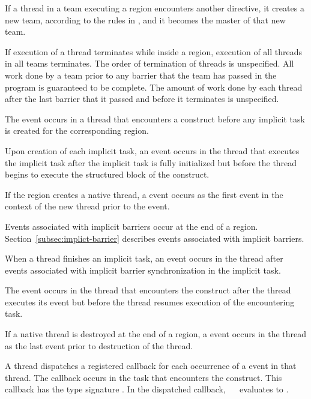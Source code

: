If a thread in a team executing a  region encounters another 
directive, it creates a new team, according to the rules in
,
and it becomes the master of that new team.

If execution of a thread terminates while inside a  region, execution of all
threads in all teams terminates. The order of termination of threads is unspecified. All
work done by a team prior to any barrier that the team has passed in the program is
guaranteed to be complete. The amount of work done by each thread after the last
barrier that it passed and before it terminates is unspecified.

\events

The  event occurs in a thread that encounters a
 construct before any implicit task is created for the
corresponding  region.

Upon creation of each implicit task, an  event
occurs in the thread that executes the implicit task after the implicit
task is fully initialized but before the thread begins to execute the
structured block of the  construct.

If the  region creates a native thread, a 
event occurs as the first event in the context of the new thread prior to the 
 event.

Events associated with implicit barriers occur at the end of a
 region. Section~\ref{subsec:implict-barrier} describes events
associated with implicit barriers.

When a thread finishes an implicit task, an 
event occurs in the thread after events associated with implicit
barrier synchronization in the implicit task.

The  event occurs in the thread that encounters the
 construct after the thread executes its  
event but before the thread resumes execution of the encountering task.

If a native thread is destroyed at the end of a  region, a
 event occurs in the thread as the last event prior 
to destruction of the thread.

\tools

A thread dispatches a registered 
callback for each occurrence of a  event in that
thread.  The callback occurs in the task that encounters the 
 construct.  This callback has the type signature
. In the dispatched callback, 
\code{(}~\code{&}~ evaluates to .

